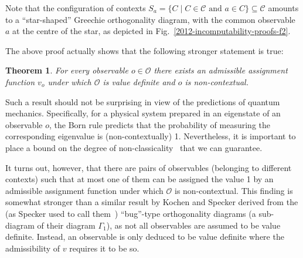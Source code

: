 \documentclass[%
 preprint,
 showpacs,
 showkeys,
 amsmath,
 amssymb,
 aps,
 pra,
 ]{revtex4-1}
\newtheorem{Theorem}{Theorem}
\theoremstyle{definition}
\begin{document}
Note that the configuration of contexts   $S_{a}=\{C \mid C\in \mathcal{C} \text{ and } a \in C \}\subseteq \mathcal{C}$
amounts to a ``star-shaped'' Greechie orthogonality diagram, with the common observable $a$ at the centre of the star,
as depicted in Fig.~\ref{2012-incomputability-proofs-f2}.



The above proof actually shows that the following stronger statement is true:\\

\begin{Theorem}
\label{thm:noonevalueindefinite}
	For every observable $o\in\mathcal{O}$ there exists an admissible assignment function $v_{o}$ under which $\mathcal{O}$ is value definite and $o$ is non-contextual.
\end{Theorem}

Such a result should not be surprising in view of the predictions of quantum mechanics.
Specifically, for a physical system prepared in an eigenstate of an observable $o$, the Born rule predicts that the probability of measuring the corresponding eigenvalue is (non-contextually) 1.
Nevertheless, it is important to place a bound on the degree of non-classicality~\cite{Elitzur199225,svozil-2011-enough} that we can guarantee.

It turns out, however, that there are pairs of observables (belonging to different contexts) such that at most one of them can be assigned the value 1 by an admissible assignment function under which $\mathcal{O}$ is non-contextual.
This finding is somewhat stronger than a similar result by Kochen and Specker \cite{kochen1,pulmannova-91}
derived from the (as Specker used to call them~\cite{Specker-priv}) ``bug''-type orthogonality diagrams (a sub-diagram of their diagram $\Gamma_1$), as not all observables are assumed to be value definite.
Instead, an observable is only deduced to be value definite where the admissibility of $v$ requires it to be so.
\end{document}
